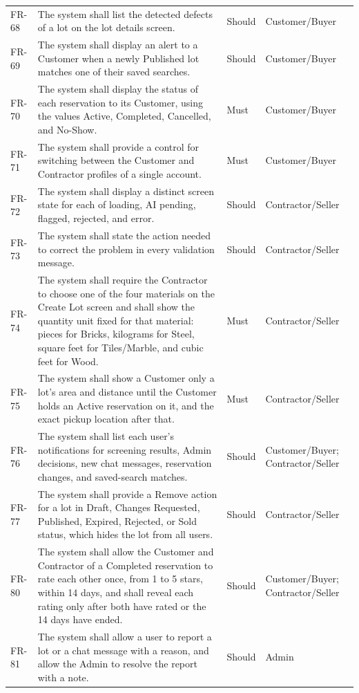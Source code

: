 {\begin{longtable}{@{}p{}p{}p{}p{}@{}}
FR-68 & The system shall list the detected defects of a lot on the lot details screen. & Should & Customer/Buyer \\
FR-69 & The system shall display an alert to a Customer when a newly Published lot matches one of their saved searches. & Should & Customer/Buyer \\
FR-70 & The system shall display the status of each reservation to its Customer, using the values Active, Completed, Cancelled, and No-Show. & Must & Customer/Buyer \\
FR-71 & The system shall provide a control for switching between the Customer and Contractor profiles of a single account. & Must & Customer/Buyer \\
FR-72 & The system shall display a distinct screen state for each of loading, AI pending, flagged, rejected, and error. & Should & Contractor/Seller \\
FR-73 & The system shall state the action needed to correct the problem in every validation message. & Should & Contractor/Seller \\
FR-74 & The system shall require the Contractor to choose one of the four materials on the Create Lot screen and shall show the quantity unit fixed for that material: pieces for Bricks, kilograms for Steel, square feet for Tiles/Marble, and cubic feet for Wood. & Must & Contractor/Seller \\
FR-75 & The system shall show a Customer only a lot's area and distance until the Customer holds an Active reservation on it, and the exact pickup location after that. & Must & Contractor/Seller \\
FR-76 & The system shall list each user's notifications for screening results, Admin decisions, new chat messages, reservation changes, and saved-search matches. & Should & Customer/Buyer; Contractor/Seller \\
FR-77 & The system shall provide a Remove action for a lot in Draft, Changes Requested, Published, Expired, Rejected, or Sold status, which hides the lot from all users. & Should & Contractor/Seller \\
FR-80 & The system shall allow the Customer and Contractor of a Completed reservation to rate each other once, from 1 to 5 stars, within 14 days, and shall reveal each rating only after both have rated or the 14 days have ended. & Should & Customer/Buyer; Contractor/Seller \\
FR-81 & The system shall allow a user to report a lot or a chat message with a reason, and allow the Admin to resolve the report with a note. & Should & Admin \\

\end{longtable}}
